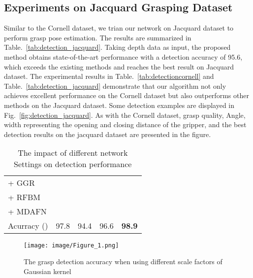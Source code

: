 \documentclass[journal]{IEEEtran}
\begin{document}
\subsection{Experiments on Jacquard Grasping Dataset}



Similar to the Cornell dataset, we trian our network on Jacquard dataset to perform grasp pose estimation. The results are summarized in Table.~\ref{tab:detection_jacquard}. Taking depth data as input, the proposed method obtains state-of-the-art performance with a detection accuracy of 95.6, which exceeds the existing methods and reaches the best result on Jacquard dataset. The experimental results in Table.~\ref{tab:detectioncornell} and Table.~\ref{tab:detection_jacquard} demonstrate that our algorithm not only achieves excellent performance on the Cornell dataset but also outperforms other methods on the Jacquard dataset. Some detection examples are displayed in Fig.~\ref{fig:detection_jacquard}. As with the Cornell dataset, grasp quality, Angle, width representing the opening and closing distance of the gripper, and the best detection results on the jacquard dataset are presented in the figure.






\begin{table}[t!]
	\caption{The impact of different network Settings on detection performance}
	\begin{center}
		\begin{tabular}{p{60pt}|p{20pt}|p{20pt}|p{20pt}|p{20pt}}
			\hline
			+ GGR&& \checkmark &\checkmark& \checkmark\\
			+ RFBM&\checkmark &  &\checkmark& \checkmark\\
			+ MDAFN&\checkmark&\checkmark &&\checkmark \\
			\hline
			Acurracy ()& 97.8 & 94.4 &96.6&\textbf{98.9} \\
			\hline
		\end{tabular}
	\end{center}
	\label{tab:settings}
\end{table}


\begin{figure}[t!]
	\centering  
	\texttt{[image: image/Figure\_1.png]}
	\caption{The grasp detection accuracy when using different scale factors of Gaussian kernel}
	\label{fig:factor}
\end{figure}
\end{document}
